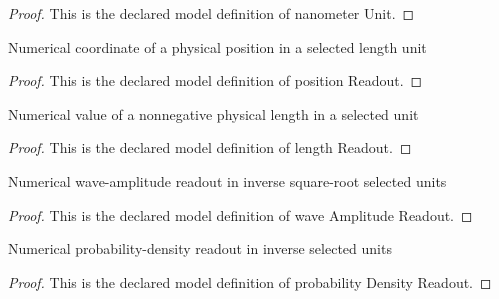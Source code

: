 \begin{proof}
  This is the declared model definition of nanometer Unit.
\end{proof}
\begin{definition}
  \label{def:physics:phyx-mini-0638:phyxminiproblems-problemphyxmini0638-positionreadout}
  Numerical coordinate of a physical position in a selected length unit
\end{definition}
\begin{proof}
  This is the declared model definition of position Readout.
\end{proof}
\begin{definition}
  \label{def:physics:phyx-mini-0638:phyxminiproblems-problemphyxmini0638-lengthreadout}
  Numerical value of a nonnegative physical length in a selected unit
\end{definition}
\begin{proof}
  This is the declared model definition of length Readout.
\end{proof}
\begin{definition}
  \label{def:physics:phyx-mini-0638:phyxminiproblems-problemphyxmini0638-waveamplitudereadout}
  Numerical wave-amplitude readout in inverse square-root selected units
\end{definition}
\begin{proof}
  This is the declared model definition of wave Amplitude Readout.
\end{proof}
\begin{definition}
  \label{def:physics:phyx-mini-0638:phyxminiproblems-problemphyxmini0638-probabilitydensityreadout}
  Numerical probability-density readout in inverse selected units
\end{definition}
\begin{proof}
  This is the declared model definition of probability Density Readout.
\end{proof}
